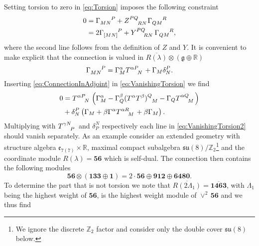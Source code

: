Setting torsion to zero in \eqref{eq:Torsion} imposes the following constraint 
\begin{equation}\label{eq:VanishingTorsion}
    \begin{aligned}
        0 &= \tensor{\Gamma}{_{MN}^P} +\tensor{Z}{^{PQ}_{RN}}\tensor{\Gamma}{_{QM}^R}\\
          &= 2\tensor{\Gamma}{_{[MN]}^P} +\tensor{Y}{^{PQ}_{RN}}\tensor{\Gamma}{_{QM}^R},
    \end{aligned}
\end{equation}
where the second line follows from the definition of $Z$ and $Y$. It is convenient to make explicit that the connection is valued in $\overbar{R(\lambda)}\otimes(\mathfrak{g}\oplus\mathbb{R})$
\begin{equation}\label{eq:ConnectionInAdjoint}
    \tensor{\Gamma}{_{MN}^P} = \Gamma_M^\alpha\tensor{T}{^\alpha ^P_N}+\Gamma_M\delta^P_N.
\end{equation}
Inserting \eqref{eq:ConnectionInAdjoint} in \eqref{eq:VanishingTorsion} we find 
\begin{equation}\label{eq:VanishingTorsion2}
    \begin{aligned}
    0 &= \tensor{T}{^{\alpha P}_N}\left(\Gamma_M^\alpha-\Gamma_Q^\beta(T^\alpha T^\beta)\tensor{}{^Q_M}-\Gamma_Q\tensor{T}{^{\alpha Q}_M}\right)\\
    &+ \delta^P_N\left(\Gamma_M+\beta\Gamma^\alpha\tensor{T}{^{\alpha R}_M}+\beta\Gamma_M\right).
    \end{aligned}
\end{equation}
Multiplying with $\tensor{T}{^{\gamma N}_P}$ and $\delta^N_P$ respectively each line in \eqref{eq:VanishingTorsion2} should vanish separately.
As an example consider an extended geometry with structure algebra $\mathfrak{e}_{7(7)}\times\mathbb{R}$, maximal compact subalgebra $\mathfrak{su}(8)/\mathbb{Z}_2$\footnote{We ignore the discrete $\mathbb{Z}_2$ factor and consider only the double cover $\mathfrak{su}(8)$ below.} and the coordinate module $R(\lambda)=\mathbf{56}$ which is self-dual. The connection then contains the following modules 
\begin{equation}
    \mathbf{56}\otimes\left(\mathbf{133}\oplus\mathbf{1}\right) = 2\cdot \mathbf{56}\oplus\mathbf{912}\oplus\mathbf{6480}.
\end{equation}
To determine the part that is not torsion we note that $\overbar{R(2\Lambda_1)}=\overbar{\mathbf{1463}}$, with $\Lambda_1$ being the highest weight of $\mathbf{56}$, is the highest weight module of $\vee^2\,\mathbf{56}$ and we thus find 
